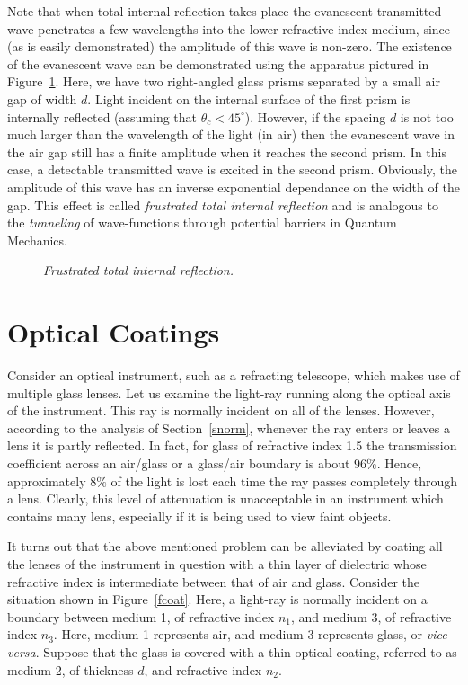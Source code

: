 Note that when total internal reflection takes place the evanescent transmitted
wave penetrates a few wavelengths into the lower refractive index medium, since (as is easily demonstrated) the amplitude of this wave is non-zero.
The existence of the evanescent wave can be demonstrated using the
apparatus pictured in Figure~\ref{fprism}. Here, we have two right-angled
glass prisms separated by a small air gap of width $d$. Light incident
on the internal surface of the first prism is internally reflected (assuming that $\theta_c<45^\circ$). However,
if the spacing $d$ is not too much larger than the  wavelength of the light (in air) then the
evanescent wave in the air gap still has a finite amplitude when it reaches the second prism. In this case, a detectable transmitted
wave is excited in the second prism. Obviously, the amplitude of this
wave has an inverse exponential dependance on the width of the gap. 
This effect is called {\em frustrated total internal reflection}\/ and
is analogous to the {\em tunneling}\/ of wave-functions through
potential barriers in Quantum Mechanics.

\begin{figure}
\epsfysize=2.25in
\centerline{}
\caption{\em Frustrated total internal reflection.}\label{fprism}
\end{figure}

\section{Optical Coatings}
Consider an optical instrument, such as a refracting telescope, which makes
use of multiple glass lenses.  Let us examine the light-ray running along the optical
axis of the instrument. This ray is normally incident on all of the lenses. 
However, according to the analysis of Section~\ref{snorm}, whenever
the ray enters or leaves a lens it is partly reflected. In fact, for glass of
refractive index 1.5 the transmission coefficient across an air/glass or
a glass/air 
boundary is about $96\%$. Hence, approximately $8\%$ of the light is lost each time the
ray passes completely through a lens. Clearly, this level of attenuation is unacceptable in an instrument which contains many lens,
especially if it is being used to view faint objects.

It turns out that the above mentioned problem can be alleviated by coating
all  the lenses of the instrument in question with a thin layer of dielectric whose
refractive index is intermediate between that of air and glass. Consider the situation shown in Figure~\ref{fcoat}. Here, a
light-ray is normally incident on a boundary between medium 1,
of refractive index $n_1$, and medium 3, of refractive index $n_3$. 
Here, medium 1 represents air, and medium 3 represents glass, or
{\em vice versa}. Suppose that the glass is covered with a thin optical
coating, referred to as medium 2, of thickness $d$, and refractive
index $n_2$. 

